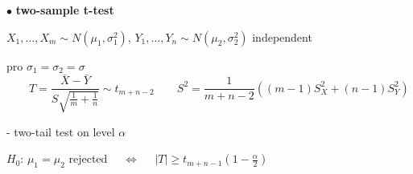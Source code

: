\documentclass[twoside]{book}
\begin{document}
\pagestyle{empty}

\def\dr #1{\par\noindent $\bullet$ {\bf #1}}



\dr{two-sample t-test}
\par $X_{1},\dots,X_{m}\sim N(\mu_1,\sigma_1^2)$,  $Y_{1},\dots,Y_{n}\sim N(\mu_2,\sigma_2^2)$ independent
\par pro $\sigma_1=\sigma_2=\sigma $
$$ \qquad
   T=\frac{\bar{X}-\bar{Y}}{S \sqrt{\frac1{m}+\frac1{n}}}\sim t_{m+n-2} \qquad
   S^2 =\frac1{m+n-2}\left( (m-1) S_{X}^2 + (n-1) S_{Y}^2 \right)    \qquad
     $$
\vspace*{1mm}
\par\noindent - two-tail test on level $\alpha$
\vspace*{3mm}
\par $H_0$:  $\mu_1=\mu_2 $ rejected $\quad\Longleftrightarrow\quad$
 $|T|\geq t_{m+n-1}(1-\frac{\alpha}2)$
\end{document}
